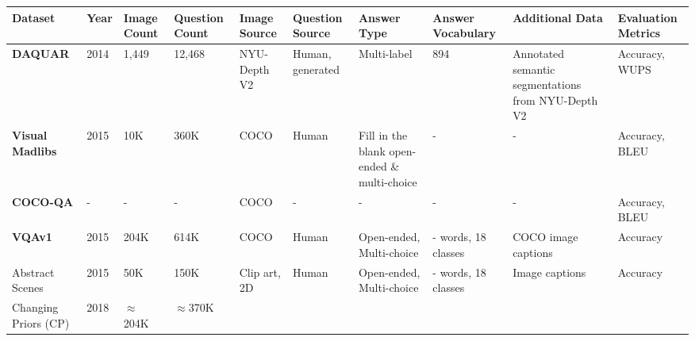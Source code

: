 \begin{landscape}
  \begin{center}
    \begin{xltabular}{\linewidth}{LLLLLLLLLL}
      \toprule
      \textbf{Dataset}
      & \textbf{Year}
      & \textbf{Image Count}
      & \textbf{Question Count}
      & \textbf{Image Source}
      & \textbf{Question Source}
      & \textbf{Answer Type}
      & \textbf{Answer Vocabulary}
      & \textbf{Additional Data}
      & \textbf{Evaluation Metrics}\\
      \midrule
      \textbf{DAQUAR} \cite{malinowski2014multiworld}
      & 2014
      & 1,449 %
      & 12,468  %
      & NYU-Depth V2 \cite{silberman2012indoor}
      & Human, generated
      & Multi-label
      & 894 %
      & Annotated semantic segmentations from  NYU-Depth V2
      & Accuracy, WUPS \\
      \textbf{Visual Madlibs} \cite{yu2015visual}
      & 2015
      & 10K  %
      & 360K  %
      & COCO \cite{lin2014microsoft}
      & Human
      & Fill in the blank open-ended \& multi-choice
      & -
      & -
      & Accuracy, BLEU \\
      \textbf{COCO-QA}
      & -
      & -
      & -
      & COCO
      & -
      & -
      & -
      & -
      & Accuracy, BLEU \\
      \textbf{VQAv1} \cite{antol2015vqa}
      & 2015
      & 204K  %
      & 614K  %
      & COCO
      & Human
      & Open-ended, Multi-choice
      & {\color{red}- words}, 18 classes
      & COCO image captions
      & Accuracy\footnotemark \\
      Abstract Scenes
      & 2015
      & 50K  %
      & 150K  %
      & Clip art, 2D
      & Human
      & Open-ended, Multi-choice
      & {\color{red}- words}, 18 classes
      & Image captions
      & Accuracy\footnotemark[\value{footnote}] \\
      Changing Priors (CP) \cite{agrawal2018dont}
      & 2018
      & {\color{red}\(\approx\)204K}  %
      & {\color{red}\(\approx\)370K}  %

\end{xltabular}
\end{center}
\end{landscape}
